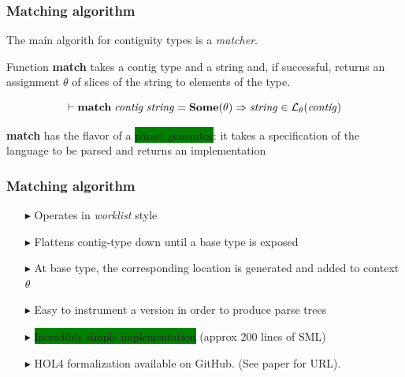 \documentclass{beamer}
\newcommand{\imp}{\Rightarrow}
\newcommand{\gemph}[1]{\colorbox{green}{#1}}
\newcommand{\konst}[1]{\ensuremath{\mbox{\bf{#1}}}}
\newcommand{\LangTheta}[1]{\ensuremath{{\mathcal L}_{\theta}({#1})}}
\begin{document}
\begin{frame}\frametitle{Matching algorithm}

  The main algorith for contiguity types is a \emph{matcher}.

Function \textbf{match} takes a contig type and a string and, if
successful, returns an assignment $\theta$ of slices of the string to
elements of the type.

\begin{theorem}[Soundness]
  \[
 \vdash \konst{match}\; \mathit{contig}\; \mathit{string} = \konst{Some}(\theta) \imp
   \mathit{string} \in \LangTheta{\mathit{contig}}
\]
\end{theorem}

\textbf{match} has the flavor of a \gemph{parser generator}: it takes a
specification of the language to be parsed and returns an implementation

\end{frame}


\begin{frame}[fragile]\frametitle{Matching algorithm}

\begin{itemize}

\item [$\blacktriangleright$] Operates in \emph{worklist} style

\item [$\blacktriangleright$] Flattens contig-type down until a base type is exposed

\item [$\blacktriangleright$] At base type, the corresponding location
  is generated and added to context $\theta$

\item [$\blacktriangleright$] Easy to instrument a version in order to produce parse trees

\item [$\blacktriangleright$] \gemph{Incredibly simple implementation} (approx 200 lines of SML)

\item [$\blacktriangleright$] HOL4 formalization available on GitHub. (See paper for URL).

\end{itemize}

\end{frame}
\end{document}
